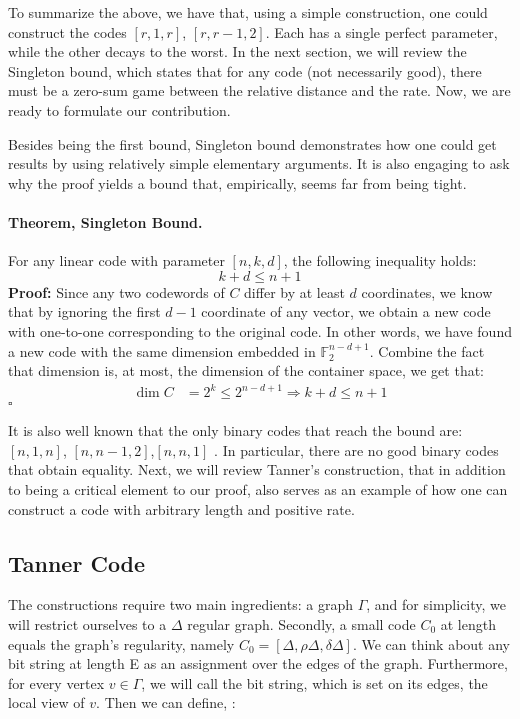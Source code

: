 \documentclass{article}
\begin{document}
\begin{multicols*}{2}
  To summarize the above, we have that, using a simple construction, one could construct the codes $[r, 1, r]$, $[r, r-1, 2]$. Each has a single perfect parameter, while the other decays to the worst. In the next section, we will review the Singleton bound, which states that for any code (not necessarily good), there must be a zero-sum game between the relative distance and the rate.
  Now, we are ready to formulate our contribution. 


  Besides being the first bound, Singleton bound demonstrates how one could get results by using relatively simple elementary arguments. It is also engaging to ask why the proof yields a bound that, empirically, seems far from being tight.
  \paragraph{Theorem, Singleton Bound.} For any linear code with parameter $[n,k,d]$, the following inequality holds:
  \begin{equation*}
    k+ d \le n + 1
  \end{equation*} 
  \textbf{Proof:} Since any two codewords of $C$ differ by at least $d$ coordinates, we know that by ignoring the first $d-1$ coordinate of any vector, we obtain a new code with one-to-one corresponding to the original code. In other words, we have found a new code with the same dimension embedded in $\mathbb{F}_{2}^{n-d+1}$. Combine the fact that dimension is, at most, the dimension of the container space, we get that:  
  \begin{equation*}
    \begin{split}
      \dim C &= 2^{k} \le 2^{n-d+1} \Rightarrow k+d \le n + 1
    \end{split}
  \end{equation*}
  $\square$

  It is also well known that the only binary codes that reach the bound are: $[n,1,n]$, $[n,n-1,2]$,$[n,n,1]$ \cite{eczoo_mds}. In particular, there are no good binary codes that obtain equality. Next, we will review Tanner's construction, that in addition to being a critical element to our proof, also serves as an example of how one can construct a code with arbitrary length and positive rate.
  \subsection{Tanner Code}
  The constructions require two main ingredients: a graph $\Gamma$, and for simplicity, we will restrict ourselves to a $\Delta$ regular graph. Secondly, a small code $C_{0}$ at length equals the graph's regularity, namely $C_{0} = [\Delta,\rho\Delta, \delta\Delta]$. We can think about any bit string at length E as an assignment over the edges of the graph. Furthermore, for every vertex $v \in \Gamma$, we will call the bit string, which is set on its edges, the local view of $v$. Then we can define, \cite{Tanner}:

\end{multicols*}
\end{document}
